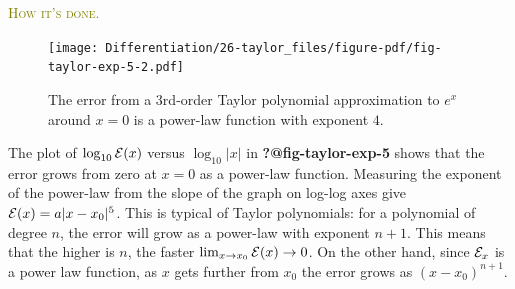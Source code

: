 \documentclass[
  letterpaper,
  DIV=11,
  numbers=noendperiod,
  oneside]{scrreprt}
\newenvironment{practice}%
{%
\textcolor{olive}{\hrulefill}%
  \par\vspace{.3\baselineskip}%
  \textcolor{olive}{\scshape How it's done.}%
  \par\vspace{\baselineskip}%
}%
{\textcolor{olive}{\hrulefill}}
\begin{document}
\begin{practice}
\begin{figure}
\end{figure}

\begin{figure}

{\centering \texttt{[image: Differentiation/26-taylor\_files/figure-pdf/fig-taylor-exp-5-2.pdf]}

}

\caption{\label{fig-taylor-exp-5-2}The error from a 3rd-order Taylor
polynomial approximation to \(e^x\) around \(x=0\) is a power-law
function with exponent \(4\).}

\end{figure}

The plot of \(\log_{10} {\cal E}(x)\) versus \(\log_{10} | x |\) in
\textbf{?@fig-taylor-exp-5} shows that the error grows from zero at
\(x=0\) as a power-law function. Measuring the exponent of the power-law
from the slope of the graph on log-log axes give
\({\cal E}(x) = a |x-x_0|^5\). This is typical of Taylor polynomials:
for a polynomial of degree \(n\), the error will grow as a power-law
with exponent \(n+1\). This means that the higher is \(n\), the faster
\(\lim_{x\rightarrow x_0}{\cal E}(x) \rightarrow 0\). On the other hand,
since \({\cal E}_x\) is a power law function, as \(x\) gets further from
\(x_0\) the error grows as \(\left(x-x_0\right)^{n+1}\).

\end{practice}
\end{document}
